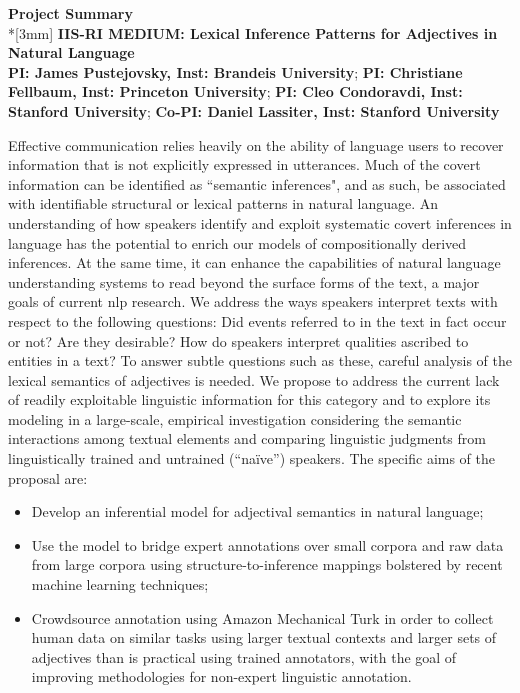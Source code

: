 \documentclass[10pt]{article}
\begin{document}
\begin{center}
\vspace{-0.5em}
{\Large {\bf Project Summary}}\\*[3mm]
\vspace{-0.5em}
{\bf IIS-RI MEDIUM: 
Lexical Inference Patterns for Adjectives in Natural Language}\\
{\bf PI: James Pustejovsky,  Inst: Brandeis University}; {\bf PI: Christiane Fellbaum,  Inst: Princeton University};
{\bf PI: Cleo Condoravdi,  Inst: Stanford University}; {\bf Co-PI: Daniel Lassiter,  Inst: Stanford University}
\end{center}

\vspace{-0.5em}
Effective communication relies heavily on the ability of language users to recover information that is not explicitly expressed in utterances. 
Much of the covert information can be identified as ``semantic inferences", and as such, be associated with identifiable structural or lexical patterns in natural language.
An understanding of how speakers identify and exploit systematic covert inferences in language has the potential to enrich our models of compositionally derived inferences. 
At the same time, it can enhance the capabilities of natural language understanding systems to read beyond the surface forms of the text, a major goals of current {\sc nlp} research. 
We address the ways speakers interpret texts with respect to the following questions: Did events referred to in the text in fact occur or not? 
Are they desirable? 
How do speakers interpret qualities ascribed to entities in a text? 
To answer subtle questions such as these, careful analysis of the lexical semantics of adjectives is needed. 
We propose to address the current lack of readily exploitable linguistic information for this category and to explore its modeling in a large-scale, empirical investigation considering the semantic interactions among textual elements and comparing linguistic judgments from linguistically trained and untrained (``na\"ive'') speakers. The specific aims of the proposal are:

\vspace{-0.4em}
\begin{itemize}

\item Develop an inferential model for adjectival semantics in natural language;

\vspace{-0.5em}
\item Use the model to bridge expert annotations over small corpora and raw data from large corpora using structure-to-inference mappings bolstered by recent machine learning techniques;

\vspace{-0.5em}
\item Crowdsource annotation using Amazon Mechanical Turk in order to collect human data on similar tasks using larger textual contexts and larger sets of adjectives than is practical using trained annotators, with the goal of improving methodologies for non-expert linguistic annotation.
\end{itemize}
\end{document}
